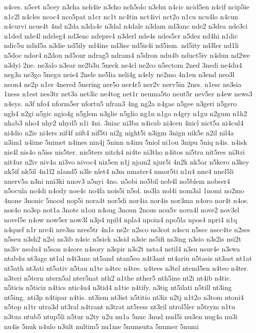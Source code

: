 {n4ces.
n5cet
n5cey
n3cha
nch4ie
n3cho
nch5olo
n3chu
n4cic
ncid5en
n4cif
ncip5ie
n1c2l
n4cles
ncoc4
nco5pat
n1cr
nc1t
nc4tin
nct4ivi
nct2o
n1cu
ncu4lo
n4cun
n4curvi
ncus4t
4nd
n2da
n3da4c
n3dal
n4dale
n3dam
nd3anc
nde2
n3dea
nde3ci
n1ded
nde4l
ndeleg4
nd3enc
ndepre4
n3derl
nde4s
ndes5cr
n5dez
nd4hi
n1dic
ndic5u
ndid5a
n3die
nd5ily
nd4ine
nd3ise
nd5is4i
nd5ism.
nd5ity
nd3ler
nd1li
n5doc
ndor4
n2dou
nd5our
ndrag5
ndram4
n5dron
ndu4b
nduct5iv
n4dun
nd2we
n3dyi
2ne.
ne3alo
n3ear
ne2b3u
5neck
ne4cl
ne2co
n5ectom
2ned
3nedi
ne4du4
neg3a
ne3go
5negu
neis4
2nele
ne5lia
neli4g
n4ely
ne2mo
4n1en
n3end
neo3l
neon4
ne2p
n1er
4nered
5nering
ner5o
ner4r5
ner2v
nerv5in
2nes.
n1esc
ne3sia
1ness
n1est
nes3tr
net3a
net3ic
ne4tog
net1r
neuma5to
neut5r
nev5er
n4ew
news3
n4eys.
n3f
nfo4
nform5er
nfortu5
nfran3
4ng
ng2a
n4gae
n5gee
n3geri
n5gero
ngh4
n2gi
n5gic
ngio4g
n5glem
n3glie
n5glio
ng1n
n1go
n4gry
n1gu
n2gum
n1h2
nhab3
nho4
nhy2
nhyd5
n1i
4ni.
3niac
ni3ba
n4icab
ni4cen
4nicl
nict5a
ni4cul4
ni4dio
n2ie
ni4ers
nif4f
nift4
nif5ti
ni2g
night5i
n3igm
3nign
nik5e
n2il
nil4a
n3im1
n4ime
5nimet
n4ines
nin4j
5ninn
n4inu
5niol
ni1ou
3nipu
5niq
n4is.
n4isk
nis4l
nis4o
n5iss
nis5ter.
nis5ters
nitch4
ni4te
ni3tho
n4itos
ni5tra
nit5res
ni3tri
nit4ur
n2iv
niv4a
ni3vo
nivoc4
niz5en
n1j
njam2
njur5i
4n2k
nk5ar
n5kero
n3key
nk5if
nk5il
4n1l2
nland5
n3le
nlet4
n3m
nmater4
nmor5ti
n1n4
nne4
nnel5li
nnerv5a
n3ni
nni3ki
nnov3
n5nyi
4no.
n5obi
no5bil
nob4l
no5blem
nobser4
n5ocula
no4di
n4ody
noe4c
no4fa
nois5i
n5ol.
no3la
nol4i
nom3al
1nomi
no2mo
4none
3nonic
5nood
nop5i
nora4t
nor5di
nor4ia
nor4is
nor3ma
n4oro
nor4t
n4os.
nos4o
no3sp
not1a
3note
n1ou
n4oug
3noun
2nous
nou5v
nova4l
nove2
nov3el
novel5e
n4ow
now5er
now3l
n3p4
npil4
npla4
npoin4
npo5la
npos4
npri4
n1q
n4quef
n1r
nre4i
nre3m
nres5tr
4n1s
ns2c
n2sco
ns3cot
n4scu
n5sec
nsec4te
n2ses
n5seu
n3sh2
n2si
ns3ib
n4sic
n5sick
n3sid
n3sie
ns5ifi
ns3ing
n3sio
n3s2is
nsi2t
ns3iv
nsolu4
n5son
n4sore
n4sory
n3spir
n3s2t
nsta4
nstil4
n3su
nsur4e
n3swa
ntab4u
nt3age
nt1al
n4t3anc
nt5and
ntan5eo
n4t3ant
nt4ariu
n5tasis
nt3ast
nt1at
nt5ath
nt3ati
nt5ativ
n5tau
n1te
n4tec
n4tee.
n4tees
n3tel
ntend5en
n4teo
n4ter.
n3teri
n5tern
ntern5al
nter5nat
nth2
n1the
nther5
nth5ine
nt2i
nt4ib
n4tic.
n5ticis
n5ticiz
n4tics
ntic4u4
n3tid4
n1tie
n4tify.
n3tig
nt5ilati
n5till
nt3ing
nt5ing.
nti3p
n4tipar
n4tis.
nt3ism
nt3ist
n5titio
nt3iz
n2tj
n1t2o
n3tom
ntoni4
n5top
n1tr
ntra3d
nt3ral
n4trant
n3trat
nt5ress
nt3ril
ntrol5ler
n5trym
n1tu
n3tua
ntub5
ntup5li
n5tur
n2ty
n2u
nu1a
5nuc
3nud
nud5i
nu3en
nug4a
nu3i
nu4is
5nuk
n4ulo
n3ult
nultim5
nu1me
5numenta
5numer
5numi
}
